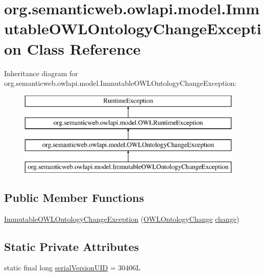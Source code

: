 \hypertarget{classorg_1_1semanticweb_1_1owlapi_1_1model_1_1_immutable_o_w_l_ontology_change_exception}{\section{org.\-semanticweb.\-owlapi.\-model.\-Immutable\-O\-W\-L\-Ontology\-Change\-Exception Class Reference}
\label{classorg_1_1semanticweb_1_1owlapi_1_1model_1_1_immutable_o_w_l_ontology_change_exception}
}
Inheritance diagram for org.\-semanticweb.\-owlapi.\-model.\-Immutable\-O\-W\-L\-Ontology\-Change\-Exception\-:\begin{figure}[H]
\begin{center}
\leavevmode
\includegraphics[height=4.000000cm]{classorg_1_1semanticweb_1_1owlapi_1_1model_1_1_immutable_o_w_l_ontology_change_exception}
\end{center}
\end{figure}
\subsection*{Public Member Functions}
\begin{DoxyCompactItemize}
\item 
\hyperlink{classorg_1_1semanticweb_1_1owlapi_1_1model_1_1_immutable_o_w_l_ontology_change_exception_a3c227037a4119dd1a9cc37733cf430de}{Immutable\-O\-W\-L\-Ontology\-Change\-Exception} (\hyperlink{classorg_1_1semanticweb_1_1owlapi_1_1model_1_1_o_w_l_ontology_change}{O\-W\-L\-Ontology\-Change} \hyperlink{classorg_1_1semanticweb_1_1owlapi_1_1model_1_1_o_w_l_ontology_change_exception_a9e4c14dc90fcc563956fb7207c67640a}{change})
\end{DoxyCompactItemize}
\subsection*{Static Private Attributes}
\begin{DoxyCompactItemize}
\item 
static final long \hyperlink{classorg_1_1semanticweb_1_1owlapi_1_1model_1_1_immutable_o_w_l_ontology_change_exception_a669b651afd95bee3c65a84092309d5c2}{serial\-Version\-U\-I\-D} = 30406\-L
\end{DoxyCompactItemize}


